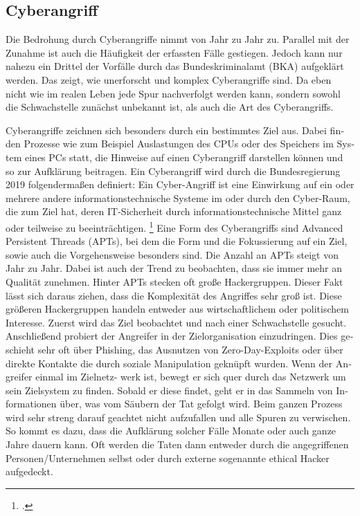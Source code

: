 \begin{otherlanguage}{ngerman}
\subsection{Cyberangriff}
Die Bedrohung durch Cyberangriffe nimmt von Jahr zu Jahr zu. Parallel mit der Zunahme ist auch die Häufigkeit der erfassten Fälle gestiegen. Jedoch kann nur nahezu ein Drittel der Vorfälle durch das Bundeskriminalamt (BKA) aufgeklärt werden.
Das zeigt, wie unerforscht und komplex Cyberangriffe sind.
Da eben nicht wie im realen Leben jede Spur nachverfolgt werden kann, sondern sowohl die Schwachstelle zunächst unbekannt ist, als auch die Art des Cyberangriffs.

Cyberangriffe zeichnen sich besonders durch ein bestimmtes Ziel aus. Dabei finden Prozesse wie zum Beispiel Auslastungen des CPUs oder des Speichers im System eines PCs statt, die Hinweise auf einen Cyberangriff darstellen können und so zur Aufklärung beitragen.
Ein Cyberangriff wird durch die Bundesregierung 2019 folgendermaßen definiert: \glqq 
Ein Cyber-Angriff ist eine Einwirkung auf ein oder mehrere andere informationstechnische Systeme im oder durch den Cyber-Raum, die zum Ziel hat, deren IT-Sicherheit durch informationstechnische Mittel ganz oder teilweise zu beeinträchtigen.\grqq{} \footcite{Cyberbundesreg}
\newline
Eine Form des Cyberangriffs sind Advanced Persistent Threads (APTs), bei dem die Form
und die Fokussierung auf ein Ziel, sowie auch die Vorgehensweise besonders
sind. Die Anzahl an APTs steigt von Jahr zu Jahr. Dabei ist auch der Trend zu beobachten, dass sie immer mehr an Qualität zunehmen. Hinter APTs stecken oft große Hackergruppen. Dieser Fakt lässt sich daraus ziehen, dass die Komplexität des Angriffes sehr groß ist. Diese größeren Hackergruppen handeln entweder aus wirtschaftlichem oder politischem Interesse. \newline
Zuerst wird das Ziel beobachtet und nach einer Schwachstelle gesucht. Anschließend
probiert der Angreifer in der Zielorganisation einzudringen. Dies geschieht sehr oft
über Phishing, das Ausnutzen von Zero-Day-Exploits oder über direkte Kontakte die
durch soziale Manipulation geknüpft wurden. Wenn der Angreifer einmal im Zielnetz-
werk ist, bewegt er sich quer durch das Netzwerk um sein Zielsystem zu finden. Sobald
er diese findet, geht er in das Sammeln von Informationen über, was vom Säubern der
Tat gefolgt wird. Beim ganzen Prozess wird sehr streng darauf geachtet nicht aufzufallen und alle Spuren zu verwischen. So kommt es dazu, dass die Aufklärung solcher
Fälle Monate oder auch ganze Jahre dauern kann. Oft werden die Taten dann entweder durch die angegriffenen Personen/Unternehmen selbst oder durch externe sogenannte \dq ethical Hacker \dq{} aufgedeckt.
\end{otherlanguage}
